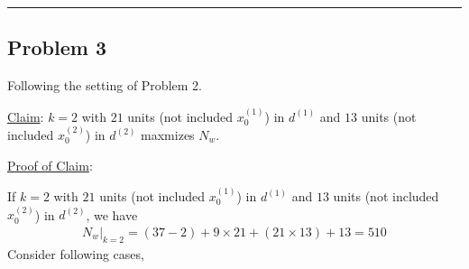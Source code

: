 \documentclass[12pt]{article}
\newcommand{\ParTh}[1]{\left(#1\right)}
\newcommand{\horrule}[1]{\rule{\linewidth}{#1}}
\begin{document}
\horrule{0.5pt}

\subsection*{Problem 3}

Following the setting of Problem 2.

\underline{Claim}: $k=2$ with $21$ units (not included $x^{\ParTh{1}}_0$) in $d^{\ParTh{1}}$ and $13$ units (not included $x^{\ParTh{2}}_0$) in $d^{\ParTh{2}}$ maxmizes $N_w$.

\underline{Proof of Claim}:

If $k=2$ with $21$ units (not included $x^{\ParTh{1}}_0$) in $d^{\ParTh{1}}$ and $13$ units (not included $x^{\ParTh{2}}_0$) in $d^{\ParTh{2}}$, we have
\begin{align}
\left.N_w\right|_{k=2}=\ParTh{37-2}+9\times21+\ParTh{21\times13}+13=510
\end{align}
Consider following cases,
\end{document}
